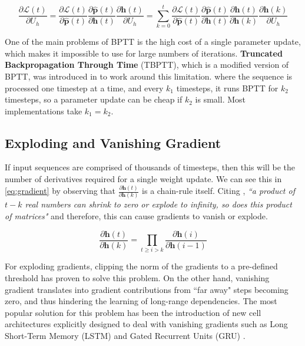 \begin{equation} \label{eq:bptt}
\frac{\partial \mathcal{L}(t)}{\partial U_h} = \frac{\partial \mathcal{L}(t)}{\partial \mathbf{\hat{p}}(t)}\frac{\partial \mathbf{\hat{p}}(t)}{\partial \mathbf{h}(t)}\frac{\partial \mathbf{h}(t)}{\partial U_h} = \sum_{k=0}^{t} \frac{\partial \mathcal{L}(t)}{\partial \mathbf{\hat{p}}(t)}\frac{\partial \mathbf{\hat{p}}(t)}{\partial \mathbf{h}(t)}\frac{\partial \mathbf{h}(t)}{\partial \mathbf{h}(k)}\frac{\partial \mathbf{h}(k)}{\partial U_h}
\end{equation}

One of the main problems of BPTT is the high cost of a single parameter update, which makes it impossible to use for large numbers of iterations. \textbf{Truncated Backpropagation Through Time} (TBPTT), which is a modified version of BPTT, was introduced in \cite{sutskever2013training} to work around this limitation.  where the sequence is processed one timestep at a time, and every $k_1$ timesteps, it runs BPTT for $k_2$ timesteps, so a parameter update can be cheap if $k_2$ is small. Most implementations take $k_1=k_2$.

\subsection{Exploding and Vanishing Gradient}

If input sequences are comprised of thousands of timesteps, then this will be the number of derivatives required for a single weight update. We can see this in \autoref{eq:gradient} by observing that $\frac{\partial \mathbf{h}(t)}{\partial \mathbf{h}(k)}$ is a chain-rule itself. Citing \cite{pascanu2013difficulty}, \textit{``a product of $t-k$ real numbers can shrink to zero or explode to infinity, so does this product of matrices"} and therefore, this can cause gradients to vanish or explode. 

\begin{equation} \label{eq:gradient}
	\frac{\partial \mathbf{h}(t)}{\partial \mathbf{h}(k)} = \prod_{t \geq i > k} \frac{\partial \mathbf{h}(i)}{\partial \mathbf{h}(i-1)}
\end{equation}

For exploding gradients, clipping the norm of the gradients to a pre-defined threshold has proven to solve this problem. On the other hand, vanishing gradient translates into gradient contributions from ``far away" steps becoming zero, and thus hindering the learning of long-range dependencies. The most popular solution for this problem has been the introduction of new cell architectures explicitly designed to deal with vanishing gradients such as Long Short-Term Memory (LSTM) \cite{hochreiter1997long} and Gated Recurrent Units (GRU) \cite{cho2014learning}.

